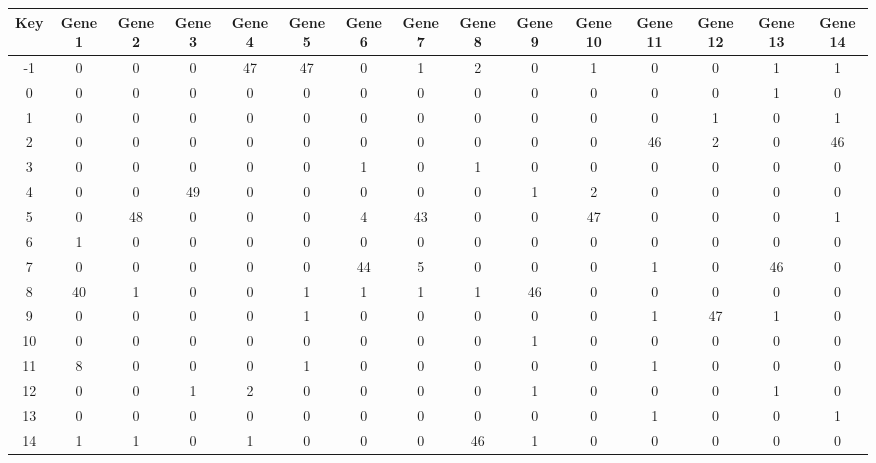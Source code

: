 \begin{tabular}{|c|c|c|c|c|c|c|c|c|c|c|c|c|c|c|}
\hline
Key & Gene 1 & Gene 2 & Gene 3 & Gene 4 & Gene 5 & Gene 6 & Gene 7 & Gene 8 & Gene 9 & Gene 10 & Gene 11 & Gene 12 & Gene 13 & Gene 14 \\
\hline
-1 & 0 & 0 & 0 & 47 & 47 & 0 & 1 & 2 & 0 & 1 & 0 & 0 & 1 & 1 \\
0 & 0 & 0 & 0 & 0 & 0 & 0 & 0 & 0 & 0 & 0 & 0 & 0 & 1 & 0 \\
1 & 0 & 0 & 0 & 0 & 0 & 0 & 0 & 0 & 0 & 0 & 0 & 1 & 0 & 1 \\
2 & 0 & 0 & 0 & 0 & 0 & 0 & 0 & 0 & 0 & 0 & 46 & 2 & 0 & 46 \\
3 & 0 & 0 & 0 & 0 & 0 & 1 & 0 & 1 & 0 & 0 & 0 & 0 & 0 & 0 \\
4 & 0 & 0 & 49 & 0 & 0 & 0 & 0 & 0 & 1 & 2 & 0 & 0 & 0 & 0 \\
5 & 0 & 48 & 0 & 0 & 0 & 4 & 43 & 0 & 0 & 47 & 0 & 0 & 0 & 1 \\
6 & 1 & 0 & 0 & 0 & 0 & 0 & 0 & 0 & 0 & 0 & 0 & 0 & 0 & 0 \\
7 & 0 & 0 & 0 & 0 & 0 & 44 & 5 & 0 & 0 & 0 & 1 & 0 & 46 & 0 \\
8 & 40 & 1 & 0 & 0 & 1 & 1 & 1 & 1 & 46 & 0 & 0 & 0 & 0 & 0 \\
9 & 0 & 0 & 0 & 0 & 1 & 0 & 0 & 0 & 0 & 0 & 1 & 47 & 1 & 0 \\
10 & 0 & 0 & 0 & 0 & 0 & 0 & 0 & 0 & 1 & 0 & 0 & 0 & 0 & 0 \\
11 & 8 & 0 & 0 & 0 & 1 & 0 & 0 & 0 & 0 & 0 & 1 & 0 & 0 & 0 \\
12 & 0 & 0 & 1 & 2 & 0 & 0 & 0 & 0 & 1 & 0 & 0 & 0 & 1 & 0 \\
13 & 0 & 0 & 0 & 0 & 0 & 0 & 0 & 0 & 0 & 0 & 1 & 0 & 0 & 1 \\
14 & 1 & 1 & 0 & 1 & 0 & 0 & 0 & 46 & 1 & 0 & 0 & 0 & 0 & 0 \\
\hline
\end{tabular}